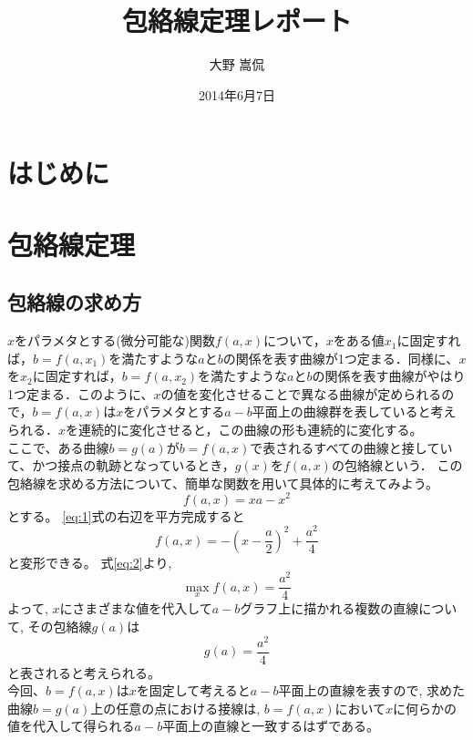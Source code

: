 \documentclass[11pt,a4j,fleqn]{jarticle}
\title{包絡線定理レポート}
\author{大野 嵩侃}
\date{2014年6月7日}
\begin{document}
\maketitle

\section{はじめに}



\section{包絡線定理}

\subsection{包絡線の求め方}
$x$をパラメタとする(微分可能な)関数$f(a,x)$について，$x$をある値$x_1$に固定すれば，$b=f(a,x_1)$を満たすような$a$と$b$の関係を表す曲線が1つ定まる．同様に、$x$を$x_2$に固定すれば，$b=f(a,x_2)$を満たすような$a$と$b$の関係を表す曲線がやはり1つ定まる．このように、$x$の値を変化させることで異なる曲線が定められるので，$b=f(a,x)$は$x$をパラメタとする$a-b$平面上の曲線群を表していると考えられる．$x$を連続的に変化させると，この曲線の形も連続的に変化する。\\
ここで、ある曲線$b=g(a)$が$b=f(a,x)$で表されるすべての曲線と接していて、かつ接点の軌跡となっているとき，$g(x)$を$f(a,x)$の包絡線という．
この包絡線を求める方法について、簡単な関数を用いて具体的に考えてみよう。\\
\begin{equation}
f(a, x) = x a - x^2\label{eq:1}
\end{equation}
とする。
\eqref{eq:1}式の右辺を平方完成すると
\begin{equation}
f(a,  x) = -\left(x - \frac{a}{2}\right)^2 + \frac{a^2}{4} \label{eq:2}
\end{equation}
と変形できる。
式\eqref{eq:2}より, 
\begin{equation} 
\max_{x}f(a, x) = \frac{a^2}{4} \label{eq:3}
\end{equation}
よって, $x$にさまざまな値を代入して$a-b$グラフ上に描かれる複数の直線について, その包絡線$g(a)$は
\begin{equation} 
g(a) = \frac{a^2}{4} \label{eq:4}
\end{equation}
と表されると考えられる。\\
今回、$b=f(a, x)$は$x$を固定して考えると$a-b$平面上の直線を表すので, 求めた曲線$b=g(a)$上の任意の点における接線は, $b=f(a, x)$において$x$に何らかの値を代入して得られる$a-b$平面上の直線と一致するはずである。\\
\end{document}
